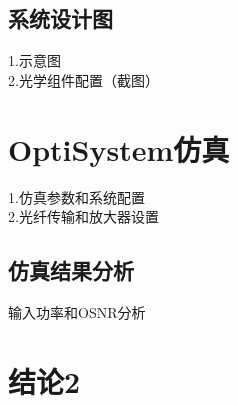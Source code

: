 \documentclass[12pt, a4paper, oneside]{article}
\begin{document}
\begin{spacing}{2.0}
\subsection{系统设计图}
1.示意图\\
2.光学组件配置（截图）



\section{OptiSystem仿真}
1.仿真参数和系统配置\\
2.光纤传输和放大器设置


\subsection{仿真结果分析}
输入功率和OSNR分析

\section{结论2}

\end{spacing}{}


\end{document}

